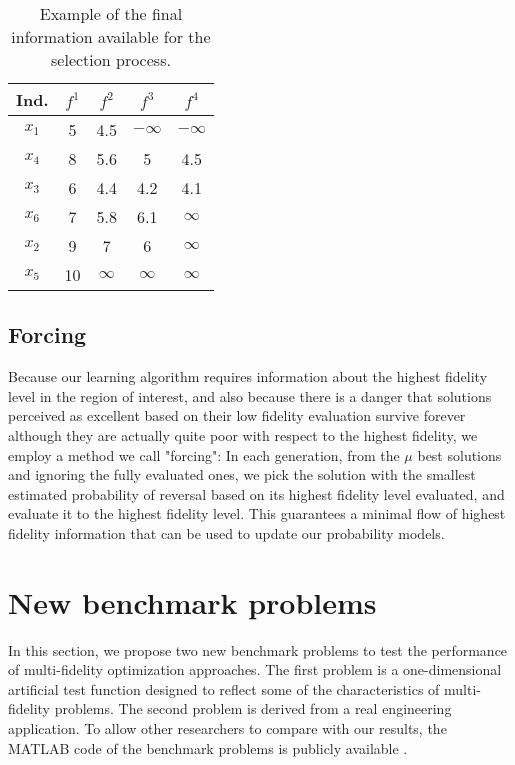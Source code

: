 \begin{table}
	\caption{Example of the final information available for the selection process. \label{tab:ex4}}
	\begin{center}
		\begin{tabular}{c|cccc}
			Ind.&$f^1$&$f^2$&$f^3$&$f^4$\\ \hline
			$x_1$&5&4.5&$-\infty$&$-\infty$\\
			$x_4$&8&5.6&5&4.5\\
			$x_3$&6&4.4&4.2&4.1\\
			$x_6$&7&5.8&6.1&$\infty$\\
			$x_2$&9&7&6&$\infty$\\
			$x_5$&10&$\infty$&$\infty$&$\infty$\\
		\end{tabular}
	\end{center}
\end{table}

\subsection{Forcing}
Because our learning algorithm requires information about the highest fidelity level in the region of interest, and also because there is a danger that solutions perceived as excellent based on their low fidelity evaluation survive forever although they are actually quite poor with respect to the highest fidelity, we employ a method we call "forcing": 
In each generation, from the $\mu$ best solutions and ignoring the fully evaluated ones, we pick the solution with the smallest estimated probability of reversal based on its highest fidelity level evaluated, and evaluate it to the highest fidelity level. This guarantees a minimal flow of highest fidelity information that can be used to update our probability models.



\section{New benchmark problems\label{sec:benchmarks}}
In this section, we propose two new benchmark problems to test the performance of multi-fidelity optimization approaches.
The first problem is a one-dimensional artificial test function designed to reflect some of the characteristics of multi-fidelity problems. The second problem 
is derived from a real engineering application. To allow other researchers to compare with our results, the MATLAB code of the benchmark problems is publicly available \cite{benchmark}.

